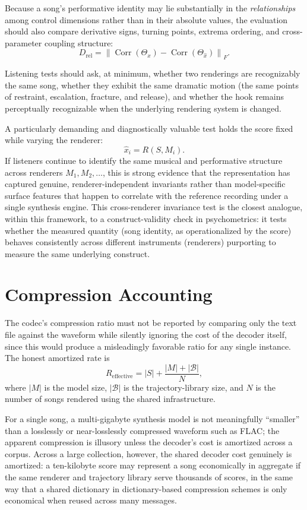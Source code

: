 \documentclass[11pt]{article}
\DeclareMathOperator{\Corr}{Corr}
\begin{document}
Because a song's performative identity may lie substantially in the \emph{relationships} among control dimensions rather than in their absolute values, the evaluation should also compare derivative signs, turning points, extrema ordering, and cross-parameter coupling structure:
\[
D_{\mathrm{rel}}
=
\left\|
\Corr(\Theta_x)
-
\Corr(\Theta_{\hat{x}})
\right\|_F.
\]

Listening tests should ask, at minimum, whether two renderings are recognizably the same song, whether they exhibit the same dramatic motion (the same points of restraint, escalation, fracture, and release), and whether the hook remains perceptually recognizable when the underlying rendering system is changed.

A particularly demanding and diagnostically valuable test holds the score fixed while varying the renderer:
\[
\hat{x}_i=R(S,M_i).
\]
If listeners continue to identify the same musical and performative structure across renderers $M_1, M_2, \ldots$, this is strong evidence that the representation has captured genuine, renderer-independent invariants rather than model-specific surface features that happen to correlate with the reference recording under a single synthesis engine. This cross-renderer invariance test is the closest analogue, within this framework, to a construct-validity check in psychometrics: it tests whether the measured quantity (song identity, as operationalized by the score) behaves consistently across different instruments (renderers) purporting to measure the same underlying construct.

\section{Compression Accounting}
\label{sec:compression}

The codec's compression ratio must not be reported by comparing only the text file against the waveform while silently ignoring the cost of the decoder itself, since this would produce a misleadingly favorable ratio for any single instance. The honest amortized rate is
\[
R_{\mathrm{effective}}
=
|S|
+
\frac{|M|+|\mathcal{B}|}{N},
\]
where $|M|$ is the model size, $|\mathcal{B}|$ is the trajectory-library size, and $N$ is the number of songs rendered using the shared infrastructure.

For a single song, a multi-gigabyte synthesis model is not meaningfully ``smaller'' than a losslessly or near-losslessly compressed waveform such as FLAC; the apparent compression is illusory unless the decoder's cost is amortized across a corpus. Across a large collection, however, the shared decoder cost genuinely is amortized: a ten-kilobyte score may represent a song economically in aggregate if the same renderer and trajectory library serve thousands of scores, in the same way that a shared dictionary in dictionary-based compression schemes is only economical when reused across many messages.
\end{document}
